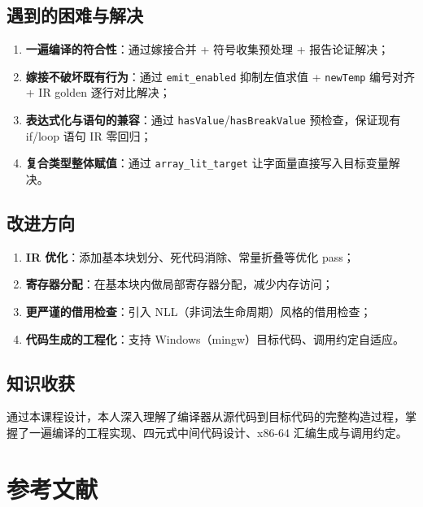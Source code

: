 \documentclass[12pt,a4paper]{ctexart}
\begin{document}
\subsection{遇到的困难与解决}

\begin{enumerate}
    \item \textbf{一遍编译的符合性}：通过嫁接合并 + 符号收集预处理 + 报告论证解决；
    \item \textbf{嫁接不破坏既有行为}：通过 \texttt{emit\_enabled} 抑制左值求值 + \texttt{newTemp} 编号对齐 + IR golden 逐行对比解决；
    \item \textbf{表达式化与语句的兼容}：通过 \texttt{hasValue}/\texttt{hasBreakValue} 预检查，保证现有 if/loop 语句 IR 零回归；
    \item \textbf{复合类型整体赋值}：通过 \texttt{array\_lit\_target} 让字面量直接写入目标变量解决。
\end{enumerate}

\subsection{改进方向}

\begin{enumerate}
    \item \textbf{IR 优化}：添加基本块划分、死代码消除、常量折叠等优化 pass；
    \item \textbf{寄存器分配}：在基本块内做局部寄存器分配，减少内存访问；
    \item \textbf{更严谨的借用检查}：引入 NLL（非词法生命周期）风格的借用检查；
    \item \textbf{代码生成的工程化}：支持 Windows（mingw）目标代码、调用约定自适应。
\end{enumerate}

\subsection{知识收获}

通过本课程设计，本人深入理解了编译器从源代码到目标代码的完整构造过程，掌握了一遍编译的工程实现、四元式中间代码设计、x86-64 汇编生成与调用约定。

\newpage

\section{参考文献}
\end{document}
